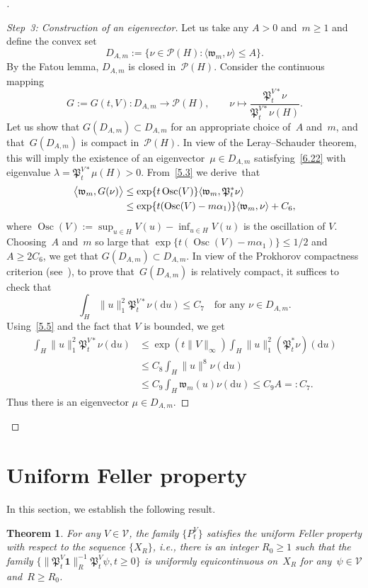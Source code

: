 \documentclass[10pt]{amsart}
\newtheorem{theo}{Theorem}[section]
\theoremstyle{definition}\newtheorem{defi}[theo]{Definition}\newtheorem{rema}[theo]{Remark}\newtheorem{exam}[theo]{Example}\newtheorem{exem}[theo]{Example}\newtheorem{nota}[theo]{Notation}
\DeclareMathOperator{\Osc}{Osc}
\newcommand{\mek}{{\mathbf 1}}
\newcommand{\PP}{{\mathcal P}}
\newcommand{\VV}{{\mathcal V}}
\newcommand{\la}{\lambda}
\newcommand{\ty}{\infty}
\newcommand{\wwww}{{\mathfrak w}}
\newcommand{\PPPP}{{\mathfrak P}}
\newcommand{\lag}{\langle}
\newcommand{\rag}{\rangle}
\newcommand{\dd}{\mathrm{d}}
\newenvironment{proofc}[1][\proofname]{\begin{proof}[{#1}]}{\end{proof}}
\begin{document}
\begin{proofc}
\begin{proof}[Step~3: Construction of an eigenvector]
Let us take any $A>0$ and~$m\ge 1$ and define the convex set
\[
D_{A,m}:=\bigl\{\nu\in\PP(H): \langle\wwww_m,\nu\rangle\le A\bigr\}.
\]
By the Fatou lemma, $D_{A,m}$ is closed in~$\PP(H)$.
Consider the continuous mapping
\[
G:=G(t,V):D_{A,m}\to \PP(H), \quad\quad \nu \mapsto \frac{\PPPP_t^{V*}\nu}{\PPPP_t^{V*}\nu(H)}.
\]
Let us show that $G(D_{A,m})\subset D_{A,m}$ for an appropriate choice of~$A$ and~$m$, and that~$G(D_{A,m})$ is compact in~$\PP(H)$. In view of the Leray--Schauder theorem, this will imply the existence of an eigenvector~$\mu\in D_{A,m}$ satisfying~\eqref{6.22} with eigenvalue $\la=\PPPP_t^{V*}\mu(H)>0$. From~\eqref{5.3} we derive~that
\begin{align*}
\bigl\langle\wwww_m,G(\nu)\bigr\rangle &\le \exp\{t\Osc(V)\}\lag \wwww_m, \PPPP_t^*\nu \rag
\notag\\
&\le \exp\{t(\Osc(V)-m\alpha_1)\}\langle\wwww_m,\nu\rangle+C_{6},
\end{align*}
where $ \Osc(V):=\sup_{u\in H} V(u)-\inf_{u\in H} V(u)$ is the oscillation of $V$. Choosing~$A$ and~$m$ so large that $\exp\{t(\Osc(V)-m\alpha_1)\}\le 1/2$ and $A\ge 2 C_{6}$, we get that $G(D_{A,m})\subset D_{A,m}$. In view of the Prokhorov compactness criterion (see~\cite[Theorem~11.5.4]{dudley2002}), to prove that~$G(D_{A,m})$ is relatively compact, it suffices to check that
\[
\int_{H}\|u\|_1^2 \PPPP_t^{V*}\nu(\dd u)\le C_{7}\quad\mbox{for any $\nu\in D_{A,m}$}.
\]
Using~\eqref{5.5} and the fact that $V$ is bounded, we get
\begin{align*}
\int_{H}\|u\|_1^2 \PPPP_t^{V*}\nu(\dd u)&\le \exp(t\|V\|_\ty)\int_{H}\|u\|_1^2 (\PPPP_t^*\nu)(\dd u)\\&\le C_8 \int_H\|u\|^8 \nu(\dd u) \\&\le C_{9} \int_H\wwww_m(u) \nu(\dd u) \le C_{9} A=:C_7.
\end{align*}
Thus there is an eigenvector $\mu\in D_{A,m}$.
\end{proof}
\let\qed\relax
\end{proofc}


\section{Uniform Feller property}\label{S:3}

In this section, we establish the following result.

\begin{theo}\label{T:3.1}
For any $V\in \VV$, the family $\{P_t^V\} $ satisfies the uniform Feller property with respect to the sequence $\{X_R\}$, i.e., there is an integer $R_0\ge1$ such that the family $\{\|\PPPP_t^V{\mek}\|_R^{-1}\PPPP_t^V\psi,t\ge0\}$ is uniformly equicontinuous on~$X_R$ for any~$\psi\in \VV$ and~$R\ge R_0$.
\end{theo}
\end{document}
